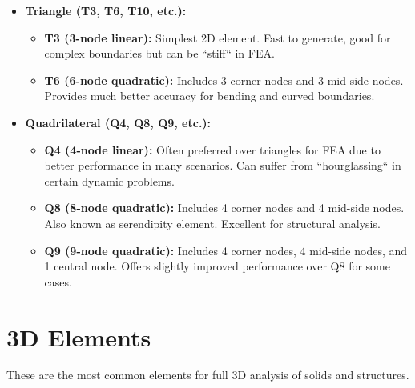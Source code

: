 \documentclass{book}
\begin{document}
\begin{itemize}[leftmargin=*,label=\textbullet]
\begin{itemize}[leftmargin=*,label=\textbullet]
    \item \textbf{Triangle (T3, T6, T10, etc.):}
    \begin{itemize}[leftmargin=*,label=$\circ$]
        \item \textbf{T3 (3-node linear):} Simplest 2D element. Fast to generate, good for complex boundaries but can be ``stiff`` in FEA.
        \item \textbf{T6 (6-node quadratic):} Includes 3 corner nodes and 3 mid-side nodes. Provides much better accuracy for bending and curved boundaries.
    \end{itemize}
    \item \textbf{Quadrilateral (Q4, Q8, Q9, etc.):}
    \begin{itemize}[leftmargin=*,label=$\circ$]
        \item \textbf{Q4 (4-node linear):} Often preferred over triangles for FEA due to better performance in many scenarios. Can suffer from ``hourglassing`` in certain dynamic problems.
        \item \textbf{Q8 (8-node quadratic):} Includes 4 corner nodes and 4 mid-side nodes. Also known as serendipity element. Excellent for structural analysis.
        \item \textbf{Q9 (9-node quadratic):} Includes 4 corner nodes, 4 mid-side nodes, and 1 central node. Offers slightly improved performance over Q8 for some cases.
    \end{itemize}
\end{itemize}

\section{3D Elements}
These are the most common elements for full 3D analysis of solids and structures.


\end{itemize}
\end{document}
